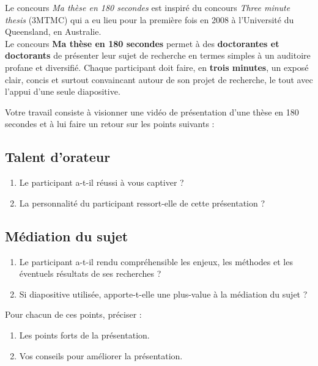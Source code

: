 \documentclass[a4paper,11pt,exos]{nsi} %
\begin{document}
\maketitle

Le concours \textit{Ma thèse en 180 secondes} est inspiré du concours \textit{Three minute thesis} (3MTMC) qui a eu lieu pour la
première fois en 2008 à l’Université du Queensland, en Australie.\\

{Le concours \textbf{Ma thèse en 180 secondes} permet à des \textbf{doctorantes et doctorants} de présenter leur sujet de
recherche en termes simples à un auditoire profane et diversifié. Chaque participant doit faire, en \textbf{trois minutes},
un exposé clair, concis et surtout convaincant autour de son projet de recherche, le tout avec l’appui d’une seule
diapositive.}

Votre travail consiste à visionner une vidéo de présentation d'une thèse en 180 secondes et à lui faire un retour sur les points suivants :

\subsection*{Talent d'orateur}
\begin{enumerate}[label=\textbullet]
    \item Le participant a-t-il réussi à vous captiver ?
    \item La personnalité du participant ressort-elle de cette présentation ?
\end{enumerate}

\subsection*{Médiation du sujet}
\begin{enumerate}[label=\textbullet]
    \item Le participant a-t-il rendu compréhensible les enjeux, les méthodes et les éventuels résultats de ses recherches ?
    \item Si diapositive utilisée, apporte-t-elle une plus-value à la médiation du sujet ?
\end{enumerate}

Pour chacun de ces points, préciser :
\begin{enumerate}[label=\textbf{\ding{241}}]
    \item Les points forts de la présentation.
    \item Vos conseils pour améliorer la présentation.
\end{enumerate}
\end{document}
